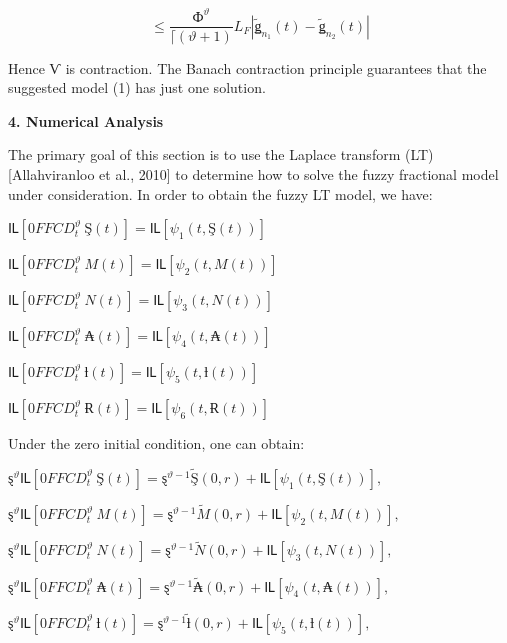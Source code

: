 \documentclass[
]{article}
\begin{document}
\[\leq \frac{Ф^{\vartheta}}{\lceil(\vartheta + 1)}L_{F}\left| {\widetilde{ǥ}}_{n_{1}}(t) - {\widetilde{ǥ}}_{n_{2}}(t) \right|\]

Hence Ѵ is contraction. The Banach contraction principle guarantees that the suggested model (1) has just one solution.

\textbf{4. Numerical Analysis}

The primary goal of this section is to use the Laplace transform (LT) {[}Allahviranloo et al., 2010{]} to determine how to solve the fuzzy fractional model under consideration. In order to obtain the fuzzy LT model, we have:

\(Ỻ\left\lbrack 0FFCD_{t}^{\vartheta}\ Ş(t) \right\rbrack = Ỻ\left\lbrack \psi_{1}\left( t,Ş(t) \right) \right\rbrack\)

\(Ỻ\left\lbrack 0FFCD_{t}^{\vartheta}\ M(t) \right\rbrack = Ỻ\left\lbrack \psi_{2}\left( t,M(t) \right) \right\rbrack\)

\(Ỻ\left\lbrack 0FFCD_{t}^{\vartheta}\ N(t) \right\rbrack = Ỻ\left\lbrack \psi_{3}\left( t,N(t) \right) \right\rbrack\)

\(Ỻ\left\lbrack 0FFCD_{t}^{\vartheta}\ ₳(t) \right\rbrack = Ỻ\left\lbrack \psi_{4}\left( t,₳(t) \right) \right\rbrack\)

\(Ỻ\left\lbrack 0FFCD_{t}^{\vartheta}\ ƚ(t) \right\rbrack = Ỻ\left\lbrack \psi_{5}\left( t,ƚ(t) \right) \right\rbrack\)

\(Ỻ\left\lbrack 0FFCD_{t}^{\vartheta}\ Ɍ(t) \right\rbrack = Ỻ\left\lbrack \psi_{6}\left( t,Ɍ(t) \right) \right\rbrack\)

Under the zero initial condition, one can obtain:

\(ȿ^{\vartheta}Ỻ\left\lbrack 0FFCD_{t}^{\vartheta}\ Ş(t) \right\rbrack = ȿ^{\vartheta - 1}\widetilde{Ş}(0,r) + Ỻ\left\lbrack \psi_{1}\left( t,Ş(t) \right) \right\rbrack,\)

\(ȿ^{\vartheta}Ỻ\left\lbrack 0FFCD_{t}^{\vartheta}\ M(t) \right\rbrack = ȿ^{\vartheta - 1}\widetilde{M}(0,r) + Ỻ\left\lbrack \psi_{2}\left( t,M(t) \right) \right\rbrack,\)

\(ȿ^{\vartheta}Ỻ\left\lbrack 0FFCD_{t}^{\vartheta}\ N(t) \right\rbrack = ȿ^{\vartheta - 1}\widetilde{N}(0,r) + Ỻ\left\lbrack \psi_{3}\left( t,N(t) \right) \right\rbrack,\ \)

\(ȿ^{\vartheta}Ỻ\left\lbrack 0FFCD_{t}^{\vartheta}\ ₳(t) \right\rbrack = ȿ^{\vartheta - 1}\widetilde{₳}(0,r) + Ỻ\left\lbrack \psi_{4}\left( t,₳(t) \right) \right\rbrack,\)

\(ȿ^{\vartheta}Ỻ\left\lbrack 0FFCD_{t}^{\vartheta}\ ƚ(t) \right\rbrack = ȿ^{\vartheta - 1}\widetilde{ƚ}(0,r) + Ỻ\left\lbrack \psi_{5}\left( t,ƚ(t) \right) \right\rbrack,\)
\end{document}
